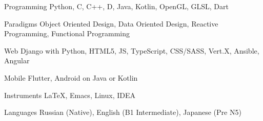 


\begin{cvskills}


\cvskill
{Programming} %
{Python, C, C++, D, Java, Kotlin, OpenGL, GLSL, Dart} %

\cvskill
{Paradigms} %
{Object Oriented Design, Data Oriented Design, Reactive Programming, Functional Programming}



\cvskill
{Web} %
{Django with Python, HTML5, JS, TypeScript, CSS/SASS, Vert.X, Ansible, Angular} %

\cvskill
{Mobile} %
{Flutter, Android on Java or Kotlin} %

\cvskill
{Instruments}
{LaTeX, Emacs, Linux, IDEA}


\cvskill
{Languages} %
{Russian (Native), English (B1 Intermediate), Japanese (Pre N5)} %


\end{cvskills}

